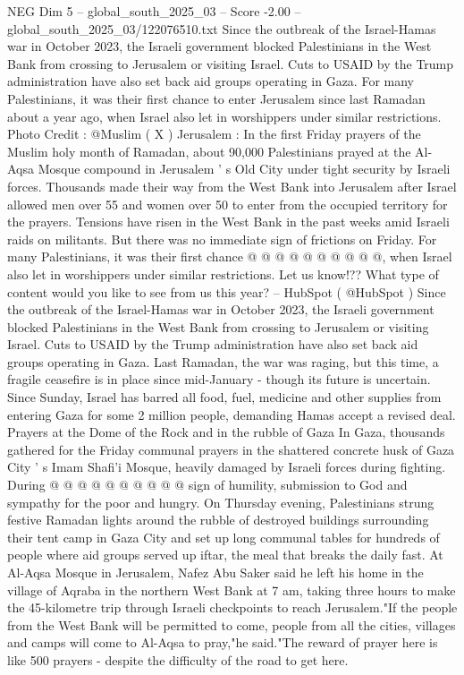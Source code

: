 \begin{textsample}{NEG Dim 5 – global\_south\_2025\_03 – Score -2.00 – global\_south\_2025\_03/122076510.txt}  \label{ex:f5_neg_270}
Since the outbreak of the Israel-Hamas war in October 2023, the Israeli government blocked Palestinians in the West Bank from crossing to Jerusalem or visiting Israel.
Cuts to USAID by the Trump administration have also set back aid groups operating in Gaza.
For many Palestinians, it was their first chance to enter Jerusalem since last Ramadan about a year ago, when Israel also let in worshippers under similar restrictions.
Photo Credit : @Muslim ( X ) Jerusalem : In the first Friday prayers of the Muslim holy month of Ramadan, about 90,000 Palestinians prayed at the Al-Aqsa Mosque compound in Jerusalem ' s Old City under tight security by Israeli forces.
Thousands made their way from the West Bank into Jerusalem after Israel allowed men over 55 and women over 50 to enter from the occupied territory for the prayers.
Tensions have risen in the West Bank in the past weeks amid Israeli raids on militants.
But there was no immediate sign of frictions on Friday.
For many Palestinians, it was their first chance @ @ @ @ @ @ @ @ @ @, when Israel also let in worshippers under similar restrictions.
Let us know!??
What type of content would you like to see from us this year? -- HubSpot ( @HubSpot ) Since the outbreak of the Israel-Hamas war in October 2023, the Israeli government blocked Palestinians in the West Bank from crossing to Jerusalem or visiting Israel.
Cuts to USAID by the Trump administration have also set back aid groups operating in Gaza.
Last Ramadan, the war was raging, but this time, a fragile ceasefire is in place since mid-January - though its future is uncertain.
Since Sunday, Israel has barred all food, fuel, medicine and other supplies from entering Gaza for some 2 million people, demanding Hamas accept a revised deal.
Prayers at the Dome of the Rock and in the rubble of Gaza In Gaza, thousands gathered for the Friday communal prayers in the shattered concrete husk of Gaza City ' s Imam Shafi'i Mosque, heavily damaged by Israeli forces during fighting.
During @ @ @ @ @ @ @ @ @ @ sign of humility, submission to God and sympathy for the poor and hungry.
On Thursday evening, Palestinians strung festive Ramadan lights around the rubble of destroyed buildings surrounding their tent camp in Gaza City and set up long communal tables for hundreds of people where aid groups served up iftar, the meal that breaks the daily fast.
At Al-Aqsa Mosque in Jerusalem, Nafez Abu Saker said he left his home in the village of Aqraba in the northern West Bank at 7 am, taking three hours to make the 45-kilometre trip through Israeli checkpoints to reach Jerusalem."If the people from the West Bank will be permitted to come, people from all the cities, villages and camps will come to Al-Aqsa to pray,"he said."The reward of prayer here is like 500 prayers - despite the difficulty of the road to get here.

\end{textsample}
